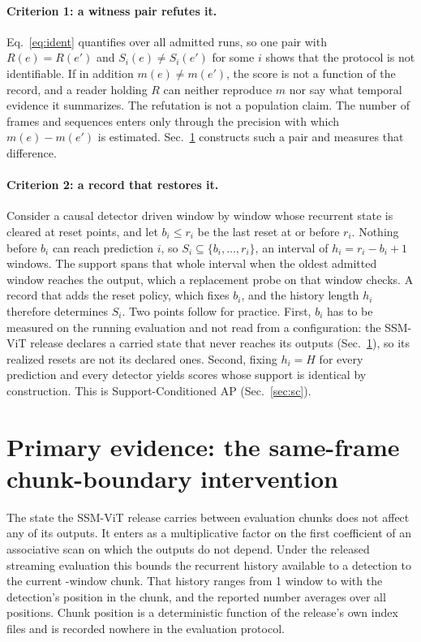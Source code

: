 \documentclass[10pt,twocolumn,letterpaper]{article}
\begin{document}
\paragraph{Criterion 1: a witness pair refutes it.}
Eq.~\ref{eq:ident} quantifies over all admitted runs, so one pair with $R(e)=R(e')$ and $S_i(e)\neq S_i(e')$ for some $i$ shows that the protocol is not identifiable. If in addition $m(e)\neq m(e')$, the score is not a function of the record, and a reader holding $R$ can neither reproduce $m$ nor say what temporal evidence it summarizes. The refutation is not a population claim. The number of frames and sequences enters only through the precision with which $m(e)-m(e')$ is estimated. Sec.~\ref{sec:chunk} constructs such a pair and measures that difference.

\paragraph{Criterion 2: a record that restores it.}
Consider a causal detector driven window by window whose recurrent state is cleared at reset points, and let $b_i\le r_i$ be the last reset at or before $r_i$. Nothing before $b_i$ can reach prediction $i$, so $S_i\subseteq\{b_i,\dots,r_i\}$, an interval of $h_i=r_i-b_i+1$ windows. The support spans that whole interval when the oldest admitted window reaches the output, which a replacement probe on that window checks. A record that adds the reset policy, which fixes $b_i$, and the history length $h_i$ therefore determines $S_i$. Two points follow for practice. First, $b_i$ has to be measured on the running evaluation and not read from a configuration: the SSM-ViT release declares a carried state that never reaches its outputs (Sec.~\ref{sec:chunk}), so its realized resets are not its declared ones. Second, fixing $h_i=H$ for every prediction and every detector yields scores whose support is identical by construction. This is Support-Conditioned AP (Sec.~\ref{sec:sc}).

\section{Primary evidence: the same-frame chunk-boundary intervention}
\label{sec:chunk}

The state the SSM-ViT release carries between evaluation chunks does not affect any of its
outputs. It enters as a multiplicative factor on the first coefficient of an associative scan
on which the outputs do not depend. Under the released streaming evaluation this bounds the
recurrent history available to a detection to the current \ssmEvalChunk{}-window chunk. That
history ranges from 1 window to \ssmEvalChunk{} with the detection's position in the chunk,
and the reported number averages over all \ssmEvalChunk{} positions. Chunk position is a
deterministic function of the release's own index files and is recorded nowhere in the
evaluation protocol.
\end{document}
